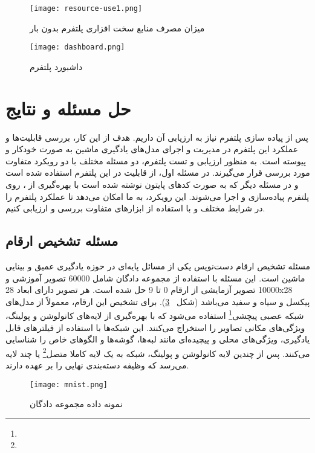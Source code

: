 \begin{figure}[!t]
	\centering
	\texttt{[image: resource-use1.png]}
	\caption{میزان مصرف منابع سخت افزاری پلتفرم بدون بار}
	\label{fig: resource use no load}
\end{figure}

\begin{figure}[!t]
	\centering
	\texttt{[image: dashboard.png]}
	\caption{داشبورد پلتفرم }
	\label{fig: dashboard}
\end{figure}


\section{حل مسئله و نتایج}
 
پس از پیاده سازی پلتفرم  نیاز به ارزیابی آن داریم. هدف از این کار، بررسی قابلیت‌ها و عملکرد این پلتفرم در مدیریت و اجرای مدل‌های یادگیری ماشین به صورت خودکار و پیوسته است. به منظور ارزیابی و تست پلتفرم، دو مسئله مختلف با دو رویکرد متفاوت مورد بررسی قرار می‌گیرند. در مسئله اول، از قابلیت  در این پلتفرم استفاده شده است و در مسئله دیگر که به صورت کدهای پایتون نوشته شده‌ است با بهره‌گیری از ، روی پلتفرم پیاده‌سازی و اجرا می‌شوند. این رویکرد، به ما امکان می‌دهد تا عملکرد پلتفرم را در شرایط مختلف و با استفاده از ابزارهای متفاوت بررسی و ارزیابی کنیم.

\subsection{مسئله تشخیص ارقام}
مسئله تشخیص ارقام دست‌نویس یکی از مسائل پایه‌ای در حوزه یادگیری عمیق و بینایی ماشین است. این مسئله با استفاده از مجموعه دادگان  شامل 60000 تصویر آموزشی و 10000 تصویر آزمایشی از ارقام 0 تا 9 حل شده است. هر تصویر دارای ابعاد 28x28 پیکسل و سیاه و سفید می‌باشد (شکل ~\ref{fig: mnist}). برای تشخیص این ارقام، معمولاً از مدل‌های شبکه عصبی پیچشی\footnote{} استفاده می‌شود که با بهره‌گیری از لایه‌های کانولوشن و پولینگ، ویژگی‌های مکانی تصاویر را استخراج می‌کنند. این شبکه‌ها با استفاده از فیلترهای قابل یادگیری، ویژگی‌های محلی و پیچیده‌ای مانند لبه‌ها، گوشه‌ها و الگوهای خاص را شناسایی می‌کنند. پس از چندین لایه کانولوشن و پولینگ، شبکه به یک لایه کاملا متصل\footnote{} یا چند لایه می‌رسد که وظیفه دسته‌بندی نهایی را بر عهده دارند. 

\begin{figure}[t]
	\centering
	\texttt{[image: mnist.png]}
	\caption{نمونه داده مجموعه دادگان }
	\label{fig: mnist}
\end{figure}


